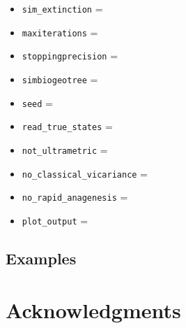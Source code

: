\documentclass[12pt,a4]{article}
\begin{document}
\begin{itemize}
\item \texttt{sim\_extinction} =\\

\item \texttt{maxiterations} =\\

\item \texttt{stoppingprecision} =\\

\item \texttt{simbiogeotree} =\\

\item \texttt{seed} =\\

\item \texttt{read\_true\_states} =\\

\item \texttt{not\_ultrametric} =\\

\item \texttt{no\_classical\_vicariance} =\\

\item \texttt{no\_rapid\_anagenesis} =\\

\item \texttt{plot\_output} =\\


\end{itemize}

\subsection{Examples}

\section{Acknowledgments}
\end{document}
